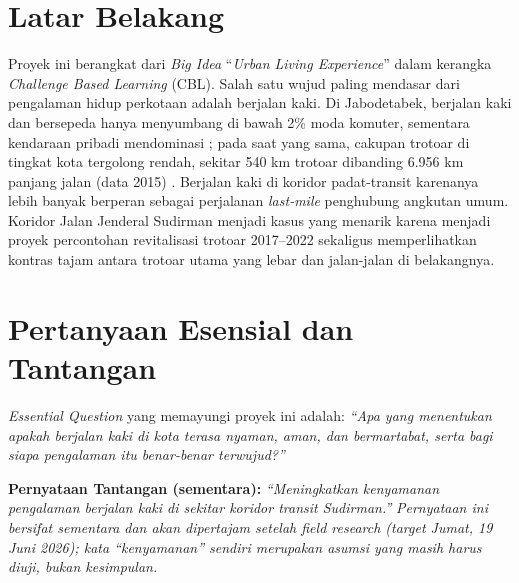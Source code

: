 \documentclass[11pt,a4paper]{report}
\begin{document}
\section{Latar Belakang}
Proyek ini berangkat dari \emph{Big Idea} ``\emph{Urban Living Experience}'' dalam kerangka
\emph{Challenge Based Learning} (CBL). Salah satu wujud paling mendasar dari pengalaman hidup
perkotaan adalah berjalan kaki. Di Jabodetabek, berjalan kaki dan bersepeda hanya menyumbang
di bawah 2\% moda komuter, sementara kendaraan pribadi mendominasi \autocite{goodstats2024};
pada saat yang sama, cakupan trotoar di tingkat kota tergolong rendah, sekitar 540 km
trotoar dibanding 6.956 km panjang jalan (data 2015) \autocite{itdp2019}. Berjalan kaki di
koridor padat-transit karenanya lebih banyak berperan sebagai perjalanan \textit{last-mile}
penghubung angkutan umum. Koridor Jalan Jenderal Sudirman menjadi kasus yang menarik karena
menjadi proyek percontohan revitalisasi trotoar 2017--2022 \autocite{beritajakarta2019,itdp2019}
sekaligus memperlihatkan kontras tajam antara trotoar utama yang lebar dan jalan-jalan di
belakangnya.

\section{Pertanyaan Esensial dan Tantangan}
\emph{Essential Question} yang memayungi proyek ini adalah: \emph{``Apa yang menentukan apakah
berjalan kaki di kota terasa nyaman, aman, dan bermartabat, serta bagi siapa pengalaman itu
benar-benar terwujud?''}

\noindent\textbf{Pernyataan Tantangan (sementara):} \emph{``Meningkatkan kenyamanan pengalaman
berjalan kaki di sekitar koridor transit Sudirman.''}
\emph{Pernyataan ini bersifat sementara dan akan dipertajam setelah \textnormal{field research}
(target Jumat, 19 Juni 2026); kata ``kenyamanan'' sendiri merupakan asumsi yang masih harus
diuji, bukan kesimpulan.}
\end{document}
